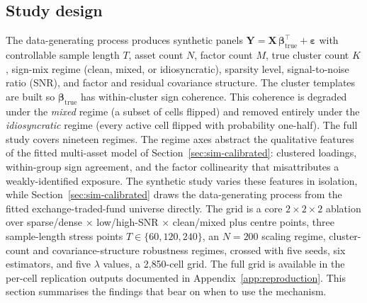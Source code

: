 \documentclass[article]{jss}
\begin{document}
\subsection[Study design]{Study design} \label{sec:sim-design}

The data-generating process produces synthetic panels
$\bm{Y} = \bm{X}\, \bm{\beta}_{\mathrm{true}}^\top + \bm{\varepsilon}$
with controllable sample length $T$, asset count $N$, factor count $M$,
true cluster count $K$, sign-mix regime (clean, mixed, or
idiosyncratic), sparsity level, signal-to-noise ratio (SNR), and factor
and residual covariance structure. The cluster templates are built so
$\bm{\beta}_{\mathrm{true}}$ has within-cluster sign coherence. This
coherence is degraded under the \emph{mixed} regime (a subset of cells
flipped) and removed entirely under the \emph{idiosyncratic} regime
(every active cell flipped with probability one-half). The full study
covers nineteen regimes. The regime axes abstract the qualitative
features of the fitted multi-asset model of
Section~\ref{sec:sim-calibrated}: clustered loadings, within-group sign
agreement, and the factor collinearity that misattributes a
weakly-identified exposure. The synthetic study varies these features in
isolation, while Section~\ref{sec:sim-calibrated} draws the data-generating
process from the fitted exchange-traded-fund universe directly. The grid
is a core $2\times2\times2$ ablation over 
sparse/dense $\times$ low/high-SNR $\times$ clean/mixed plus
centre points, three sample-length stress points
$T \in \{60, 120, 240\}$, an $N = 200$ scaling regime, cluster-count and
covariance-structure robustness regimes, crossed with five seeds, six
estimators, and five $\lambda$ values, a 2{,}850-cell grid. The full grid
is available in the per-cell replication outputs documented in
Appendix~\ref{app:reproduction}. This
section summarises the findings that bear on when to use the mechanism.
\end{document}
